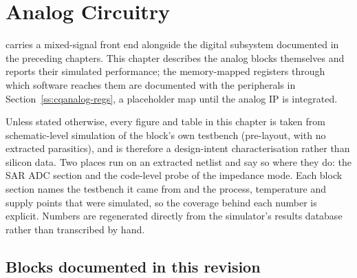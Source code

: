 
\section{Analog Circuitry} \label{s:analog}

\AsicNameForUserGuide{} carries a mixed-signal front end alongside the digital
subsystem documented in the preceding chapters. This chapter describes the analog
blocks themselves and reports their simulated performance; the memory-mapped
registers through which software reaches them are documented with the
peripherals\ifcqanalog{} in Section~\ref{ss:cqanalog-regs}, a placeholder map until
the analog IP is integrated\fi.

Unless stated otherwise, every figure and table in this chapter is taken from
schematic-level simulation of the block's own testbench (pre-layout, with no
extracted parasitics), and is therefore a design-intent characterisation rather
than silicon data. Two places run on an extracted netlist and say so where they
do: the SAR ADC section and the code-level probe of the impedance mode.
Each block section names the testbench it came from and the
process, temperature and supply points that were simulated, so the coverage behind
each number is explicit. Numbers are regenerated directly from the simulator's
results database rather than transcribed by hand.

\subsection*{Blocks documented in this revision}

